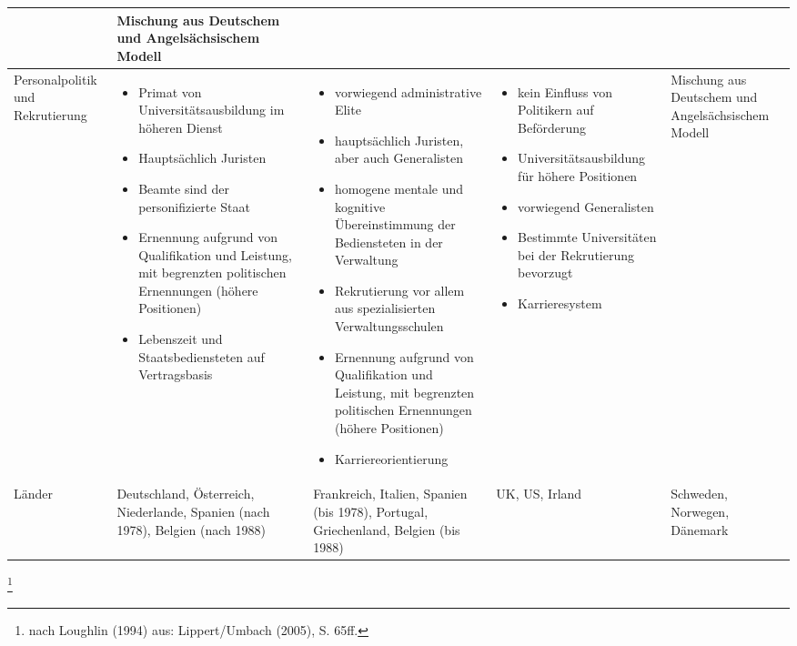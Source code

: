 \begin{landscape}
\begin{table}[!hbt]
\begin{tabular}{|L{4cm}|L{5cm}|L{5cm}|L{5cm}|L{5cm}|}
&	Mischung aus Deutschem und Angelsächsischem Modell\\\hline
Personalpolitik und Rekrutierung&
\begin{itemize}
\item Primat von Universitätsausbildung im höheren Dienst
\item Hauptsächlich Juristen
\item Beamte sind der personifizierte Staat
\item Ernennung aufgrund von Qualifikation und Leistung, mit begrenzten politischen Ernennungen (höhere Positionen)
\item Lebenszeit und Staatsbediensteten auf Vertragsbasis	
\end{itemize}&
 \vspace{-2mm}
\begin{itemize}
\item vorwiegend administrative Elite
\item hauptsächlich Juristen, aber auch Generalisten
\item homogene mentale und kognitive Übereinstimmung der Bediensteten in der Verwaltung                             \item Rekrutierung vor allem aus spezialisierten Verwaltungsschulen
\item Ernennung aufgrund von Qualifikation und Leistung, mit begrenzten politischen Ernennungen (höhere Positionen)
\item Karriereorientierung
 \vspace{-2mm}
\end{itemize}
&
\begin{itemize}
\item kein Einfluss von Politikern auf Beförderung
\item Universitätsausbildung für höhere Positionen
\item  vorwiegend Generalisten
\item Bestimmte Universitäten bei der Rekrutierung bevorzugt
\item Karrieresystem
\end{itemize}&	Mischung aus Deutschem und Angelsächsischem Modell\\\hline
Länder&	Deutschland, Österreich, Niederlande, Spanien (nach 1978), Belgien (nach 1988)&	Frankreich, Italien, Spanien (bis 1978), Portugal, Griechenland, Belgien (bis 1988) 	&UK, US, Irland&	Schweden, Norwegen, Dänemark\\\hline
\end{tabular}
\end{table}	\footnote{nach Loughlin (1994) aus: Lippert/Umbach (2005), S. 65ff.}
\end{landscape}	
